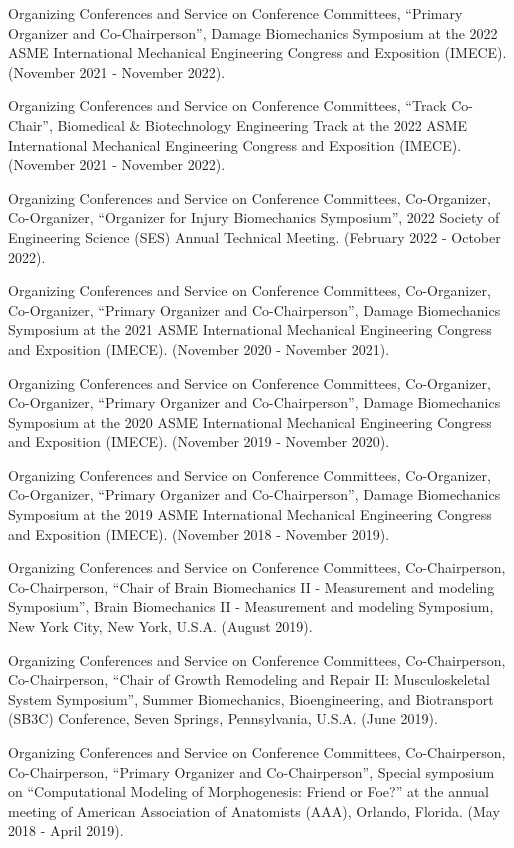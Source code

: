 \documentclass[11pt]{article}
\begin{document}
Organizing Conferences and Service on Conference Committees,
``Primary Organizer and Co-Chairperson'', Damage Biomechanics Symposium at
the 2022 ASME International Mechanical Engineering Congress and
Exposition (IMECE). 
(November 2021 - November 2022).

Organizing Conferences and Service on Conference Committees,
``Track Co-Chair'', Biomedical \& Biotechnology Engineering Track at the
2022 ASME International Mechanical Engineering Congress and Exposition
(IMECE). 
(November 2021 - November 2022).

Organizing Conferences and Service on Conference Committees,
Co-Organizer, Co-Organizer, ``Organizer for Injury Biomechanics
Symposium'', 2022 Society of Engineering Science (SES) Annual Technical
Meeting. 
(February 2022 - October 2022).

Organizing Conferences and Service on Conference Committees,
Co-Organizer, Co-Organizer, ``Primary Organizer and Co-Chairperson'',
Damage Biomechanics Symposium at the 2021 ASME International Mechanical
Engineering Congress and Exposition (IMECE). 
(November 2020 - November
2021).

Organizing Conferences and Service on Conference Committees,
Co-Organizer, Co-Organizer, ``Primary Organizer and Co-Chairperson'',
Damage Biomechanics Symposium at the 2020 ASME International Mechanical
Engineering Congress and Exposition (IMECE). 
(November 2019 - November
2020).

Organizing Conferences and Service on Conference Committees,
Co-Organizer, Co-Organizer, ``Primary Organizer and Co-Chairperson'',
Damage Biomechanics Symposium at the 2019 ASME International Mechanical
Engineering Congress and Exposition (IMECE). 
(November 2018 - November
2019).

Organizing Conferences and Service on Conference Committees,
Co-Chairperson, Co-Chairperson, ``Chair of Brain Biomechanics II -
Measurement and modeling Symposium'', Brain Biomechanics II - Measurement
and modeling Symposium, New York City, New York, U.S.A. 
(August 2019).

Organizing Conferences and Service on Conference Committees,
Co-Chairperson, Co-Chairperson, ``Chair of Growth Remodeling and Repair
II: Musculoskeletal System Symposium'', Summer Biomechanics,
Bioengineering, and Biotransport (SB3C) Conference, Seven Springs,
Pennsylvania, U.S.A. 
(June 2019).

Organizing Conferences and Service on Conference Committees,
Co-Chairperson, Co-Chairperson, ``Primary Organizer and Co-Chairperson'',
Special symposium on ``Computational Modeling of Morphogenesis: Friend or
Foe?'' at the annual meeting of American Association of Anatomists (AAA),
Orlando, Florida. 
(May 2018 - April 2019).
\end{document}
